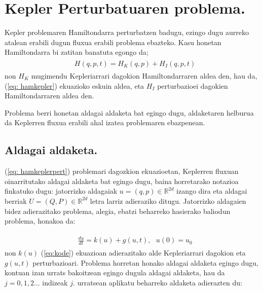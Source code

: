 \section{Kepler Perturbatuaren problema.}

Kepler problemaren Hamiltondarra perturbatzen badugu, ezingo dugu aurreko atalean erabili dugun fluxua erabili problema ebazteko. Kasu honetan Hamiltondarra  bi zatitan banatuta egongo da;
\begin{align}
\begin{split}
\label{eq: hamkeplerpert}
&H(q,p,t)=H_K(q,p)+H_I(q,p,t)
\end{split}
\end{align} 
non $H_K$ mugimendu Kepleriarrari dagokion Hamiltondarraren aldea den, hau da, (\ref{eq: hamkepler}) ekuazioko eskuin aldea, eta $H_I$ perturbazioei dagokien Hamiltondarraren aldea den.

Problema berri honetan aldagai aldaketa bat egingo dugu, aldaketaren helburua da Keplerren fluxua erabili ahal izatea problemaren ebazpenean. 

\subsection*{Aldagai aldaketa.}


(\ref{eq: hamkeplerpert}) problemari dagozkion ekuazioetan, Keplerren fluxuan oinarritutako aldagai aldaketa bat egingo dugu, baina horretarako notazioa finkatuko dugu: jatorrizko aldagaiak $u=(q,p) \in \mathbb{R}^{2d}$ izango dira eta aldagai berriak $U=(Q,P) \in \mathbb{R}^{2d}$ letra larriz adieraziko ditugu. Jatorrizko aldagaien bidez adierazitako problema, alegia, ebatzi beharreko hasierako baliodun problema, honakoa da:

\begin{align}
\begin{split}
\label{eq: HamEDA}
&\frac{du}{dt} = k(u) + g(u,t),\ \ \ u(0) = u_0
\end{split}
\end{align} 
non $k(u)$ (\ref{eq:kode}) ekuazioan adierazitako alde Kepleriarrari dagokion  eta $g(u,t)$ perturbazioari. 
Problema horretan honako aldagai aldaketa egingo dugu, kontuan izan urrats bakoitzean egingo dugula aldagai aldaketa, hau da $j=0, 1, 2 \ldots$ indizeak $j$. urratsean aplikatu beharreko aldaketa adierazten du:

